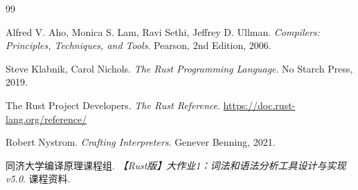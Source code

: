 \documentclass[UTF8,a4paper,12pt]{ctexart}
\begin{document}
\begin{thebibliography}{99}

Alfred V. Aho, Monica S. Lam, Ravi Sethi, Jeffrey D. Ullman.
\newblock \textit{Compilers: Principles, Techniques, and Tools}.
\newblock Pearson, 2nd Edition, 2006.

Steve Klabnik, Carol Nichols.
\newblock \textit{The Rust Programming Language}.
\newblock No Starch Press, 2019.

The Rust Project Developers.
\newblock \textit{The Rust Reference}.
\newblock \url{https://doc.rust-lang.org/reference/}

Robert Nystrom.
\newblock \textit{Crafting Interpreters}.
\newblock Genever Benning, 2021.

同济大学编译原理课程组.
\newblock \textit{【Rust版】大作业1：词法和语法分析工具设计与实现v5.0}.
\newblock 课程资料.

\end{thebibliography}
\end{document}
